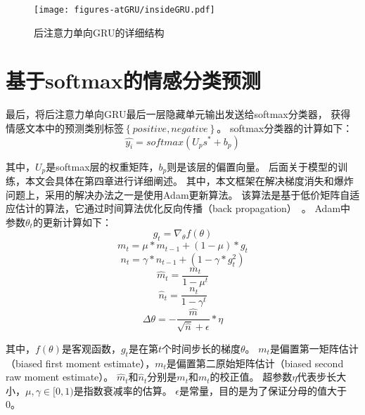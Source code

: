 \begin{figure}[h!]
	\centering
	\texttt{[image: figures-atGRU/insideGRU.pdf]}
	\caption{后注意力单向GRU的详细结构}
	\label{fig:insideGRU}
\end{figure}

\section{基于softmax的情感分类预测}
最后，将后注意力单向GRU最后一层隐藏单元输出发送给softmax分类器，
获得情感文本中的预测类别标签${\left\{positive,negative\right\}}$。
softmax分类器的计算如下：
\begin{equation}
\widehat{y_{i}}=softmax\left ( U_{p}s^{*}+b_{p} \right )
\end{equation}

其中，${U_{p}}$是softmax层的权重矩阵，${b_{p}}$则是该层的偏置向量。
后面关于模型的训练，本文会具体在第四章进行详细阐述。
其中，本文框架在解决梯度消失和爆炸问题上，采用的解决办法之一是使用Adam更新算法。
该算法是基于低价矩阵自适应估计的算法，它通过时间算法优化反向传播（back propagation）~。
Adam中参数${\theta_{t}}$的更新计算如下：
\begin{equation}
g_{t}=\nabla_{\theta }f\left ( \theta \right )
\end{equation}
\begin{equation}
m_{t}=\mu \ast m_{t-1} +\left ( 1-\mu \right ) \ast g_{t}
\end{equation}
\begin{equation}
n_{t}=\gamma  \ast n_{t-1} +\left ( 1-\gamma  \ast g_{t} ^{2} \right )
\end{equation}
\begin{equation}
\widehat{m}_{t}=\frac{m_{t}}{1-\mu ^{t}}
\end{equation}
\begin{equation}
\widehat{n}_{t}=\frac{n_{t}}{1-\gamma  ^{t}}
\end{equation}
\begin{equation}
\Delta \theta =-\frac{\widehat{m}}{\sqrt{\widehat{n}}+\epsilon }\ast \eta 
\end{equation}

其中，${f\left ( \theta \right )}$是客观函数，${g_{t}}$是在第${t}$个时间步长的梯度${\theta}$。
${m_{t}}$是偏置第一矩阵估计（biased first moment estimate），${m_{t}}$是偏置第二原始矩阵估计（biased second raw moment estimate）。
${\widehat{m}_{t}}$和${\widehat{n}_{t}}$分别是${m_{t}}$和${m_{t}}$的校正值。
超参数${\eta}$代表步长大小，${\mu,\gamma \in [0,1)}$是指数衰减率的估算。
${\epsilon}$是常量，目的是为了保证分母的值大于0。

